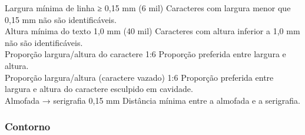 Largura mínima de linha \textbar{} ≥ 0,15 mm (6 mil) \textbar{} Caracteres com largura menor que 0,15 mm não são identificáveis. \textbar{}\\
Altura mínima do texto \textbar{} 1,0 mm (40 mil) \textbar{} Caracteres com altura inferior a 1,0 mm não são identificáveis. \textbar{}\\
Proporção largura/altura do caractere \textbar{} 1:6 \textbar{} Proporção preferida entre largura e altura. \textbar{}\\
Proporção largura/altura (caractere vazado) \textbar{} 1:6 \textbar{} Proporção preferida entre largura e altura do caractere esculpido em cavidade. \textbar{}\\
Almofada → serigrafia \textbar{} 0,15 mm \textbar{} Distância mínima entre a almofada e a serigrafia. \textbar{}

\hypertarget{contorno}{%
\subsubsection{Contorno}\label{contorno}}

